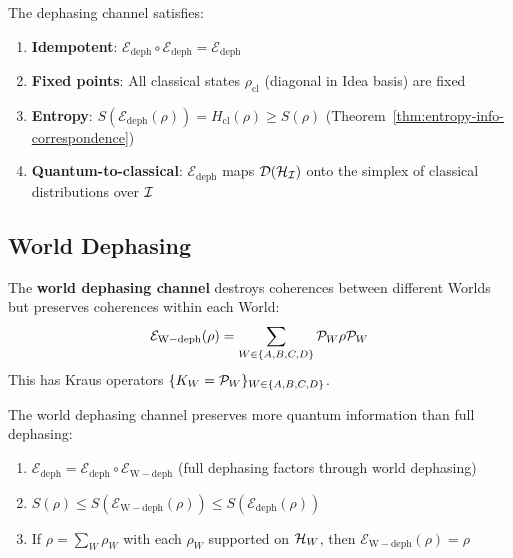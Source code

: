 \begin{proposition}
\label{prop:dephasing-properties}
The dephasing channel satisfies:
\begin{enumerate}
  \item \textbf{Idempotent}: $\mathcal{E}_{\mathrm{deph}} \circ \mathcal{E}_{\mathrm{deph}} = \mathcal{E}_{\mathrm{deph}}$
  \item \textbf{Fixed points}: All classical states $\rho_{\mathrm{cl}}$ (diagonal in Idea basis) are fixed
  \item \textbf{Entropy}: $S(\mathcal{E}_{\mathrm{deph}}(\rho)) = H_{\mathrm{cl}}(\rho) \geq S(\rho)$ (Theorem~\ref{thm:entropy-info-correspondence})
  \item \textbf{Quantum-to-classical}: $\mathcal{E}_{\mathrm{deph}}$ maps $\mathcal{D}(\mathcal{H}_{\mathcal{I}})$ onto the simplex of classical distributions over $\mathcal{I}$
\end{enumerate}
\end{proposition}

\subsection{World Dephasing}

\begin{definition}
\label{def:world-dephasing}
The \textbf{world dephasing channel} destroys coherences between different Worlds but preserves coherences within each World:
\[
\mathcal{E}_{\mathrm{W-deph}}(\rho) = \sum_{W \in \{A,B,C,D\}} \mathcal{P}_W \rho \mathcal{P}_W
\]
This has Kraus operators $\{K_W = \mathcal{P}_W\}_{W \in \{A,B,C,D\}}$.
\end{definition}

\begin{proposition}
\label{prop:world-vs-full-deph}
The world dephasing channel preserves more quantum information than full dephasing:
\begin{enumerate}
  \item $\mathcal{E}_{\mathrm{deph}} = \mathcal{E}_{\mathrm{deph}} \circ \mathcal{E}_{\mathrm{W-deph}}$ (full dephasing factors through world dephasing)
  \item $S(\rho) \leq S(\mathcal{E}_{\mathrm{W-deph}}(\rho)) \leq S(\mathcal{E}_{\mathrm{deph}}(\rho))$
  \item If $\rho = \sum_W \rho_W$ with each $\rho_W$ supported on $\mathcal{H}_W$, then $\mathcal{E}_{\mathrm{W-deph}}(\rho) = \rho$
\end{enumerate}
\end{proposition}

